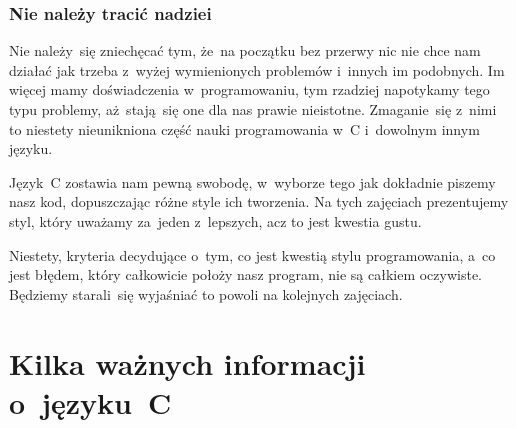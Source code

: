 \documentclass[10pt,t]{beamer}
\begin{document}
\begin{frame}
  \frametitle{Nie należy tracić nadziei}


  Nie należy~się zniechęcać tym, że~na początku bez przerwy nic nie chce
  nam działać jak trzeba z~wyżej wymienionych problemów i~innych im
  podobnych. Im więcej mamy doświadczenia w~programowaniu, tym rzadziej
  napotykamy tego typu problemy, aż~stają~się one dla nas prawie nieistotne.
  Zmaganie~się z~nimi to niestety nieunikniona część nauki programowania
  w~C i~dowolnym innym języku.

  Język~C zostawia nam pewną swobodę, w~wyborze tego jak dokładnie piszemy
  nasz kod, dopuszczając różne \alert{style} ich tworzenia. Na tych
  zajęciach prezentujemy styl, który uważamy za~jeden z~lepszych, acz to
  jest kwestia gustu.

  Niestety, kryteria decydujące o~tym, co jest kwestią stylu programowania,
  a~co jest błędem, który całkowicie położy nasz program, nie są całkiem
  oczywiste. Będziemy starali~się wyjaśniać to powoli na kolejnych zajęciach.

\end{frame}









\section{Kilka ważnych informacji o~języku~C}
\end{document}
